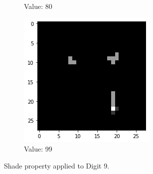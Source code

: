 \begin{figure}[htb!]
\begin{subfigure}[b]{.3\textwidth}
            \caption{Value: 80}
            \label{fig:Rotate-misclass0}
        \end{subfigure}%
        \begin{subfigure}[b]{.3\textwidth}
            \centering
            \includegraphics[width=\linewidth]{images/shade3.png}
            \caption{Value: 99}
            \label{fig:Rotate-misclass0}
        \end{subfigure}
        
        \caption{Shade property applied to Digit 9.}
        \label{fig:Rotate-misclassifications}
    \end{figure}
    \FloatBarrier
    
